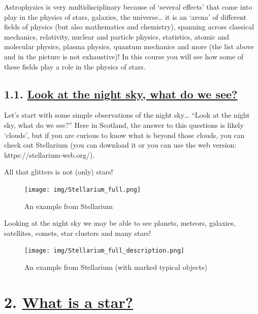 \documentclass[
  letterpaper,
  DIV=11,
  numbers=noendperiod]{scrreprt}
\begin{document}
Astrophysics is very multidisciplinary because of `several effects' that
come into play in the physics of stars, galaxies, the universe\ldots{}
it is an `arena' of different fields of physics (but also mathematics
and chemistry), spanning across classical mechanics, relativity, nuclear
and particle physics, statistics, atomic and molecular physics, plasma
physics, quantum mechanics and more (the list above and in the picture
is not exhaustive)! In this course you will see how some of these fields
play a role in the physics of stars.

\hypertarget{look-at-the-night-sky-what-do-we-see}{%
\section{\texorpdfstring{1.1. \protect\hyperlink{toc0_}{Look at the
night sky, what do we
see?}}{1.1. Look at the night sky, what do we see?}}\label{look-at-the-night-sky-what-do-we-see}}

Let's start with some simple observations of the night sky\ldots{}
``Look at the night sky, what do we see?'' Here in Scotland, the answer
to this questions is likely `clouds', but if you are curious to know
what is beyond those clouds, you can check out Stellarium (you can
download it or you can use the web version:
https://stellarium-web.org/).

All that glitters is not (only) stars!

\begin{figure}

{\centering \texttt{[image: img/Stellarium\_full.png]}

}

\caption{An example from Stellarium}

\end{figure}

Looking at the night sky we may be able to see planets, meteors,
galaxies, satellites, comets, star clusters and many stars!

\begin{figure}

{\centering \texttt{[image: img/Stellarium\_full\_description.png]}

}

\caption{An example from Stellarium (with marked typical objects)}

\end{figure}

\hypertarget{what-is-a-star}{%
\chapter{\texorpdfstring{2. \protect\hyperlink{toc0_}{What is a
star?}}{2. What is a star?}}\label{what-is-a-star}}
\end{document}
